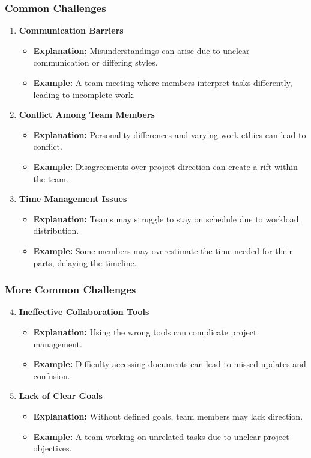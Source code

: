 \documentclass[aspectratio=169]{beamer}
\begin{document}
\begin{frame}[fragile]
    \frametitle{Common Challenges}
    \begin{enumerate}
        \item \textbf{Communication Barriers}
            \begin{itemize}
                \item \textbf{Explanation:} Misunderstandings can arise due to unclear communication or differing styles.
                \item \textbf{Example:} A team meeting where members interpret tasks differently, leading to incomplete work.
            \end{itemize}
        \item \textbf{Conflict Among Team Members}
            \begin{itemize}
                \item \textbf{Explanation:} Personality differences and varying work ethics can lead to conflict.
                \item \textbf{Example:} Disagreements over project direction can create a rift within the team.
            \end{itemize}
        \item \textbf{Time Management Issues}
            \begin{itemize}
                \item \textbf{Explanation:} Teams may struggle to stay on schedule due to workload distribution.
                \item \textbf{Example:} Some members may overestimate the time needed for their parts, delaying the timeline.
            \end{itemize}
    \end{enumerate}
\end{frame}

\begin{frame}[fragile]
    \frametitle{More Common Challenges}
    \begin{enumerate}
        \setcounter{enumi}{3} %
        \item \textbf{Ineffective Collaboration Tools}
            \begin{itemize}
                \item \textbf{Explanation:} Using the wrong tools can complicate project management.
                \item \textbf{Example:} Difficulty accessing documents can lead to missed updates and confusion.
            \end{itemize}
        \item \textbf{Lack of Clear Goals}
            \begin{itemize}
                \item \textbf{Explanation:} Without defined goals, team members may lack direction.
                \item \textbf{Example:} A team working on unrelated tasks due to unclear project objectives.
            \end{itemize}
    \end{enumerate}
\end{frame}
\end{document}
